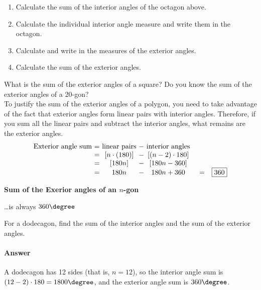 	\vspace{0.1cm}

\begin{enumerate}
\item  Calculate the sum of the interior angles of the octagon above.
\item  Calculate the individual interior angle measure and write them in the octagon.
\item  Calculate and write in the measures of the exterior angles.
\item  Calculate the sum of the exterior angles.
\end{enumerate}

\noindent \q What is the sum of the exterior angles of a square?  Do you know the sum of the exterior angles of a 20-gon?\\
	
	
To justify the sum of the exterior angles of a polygon, you need to take advantage of the fact that exterior angles form linear pairs with interior angles. Therefore, if you sum all the linear pairs and subtract the interior angles, what remains are the exterior angles.
\[ 
\begin{array}{r @{ = } c @{ - } c c l}
\text{Exterior angle sum } & \text{ linear pairs } & \text{ interior angles } \\
& [n\cdot (180)] & [(n-2) \cdot 180] \\
& [180n]& [180n-360] \\
&180n&180n+360&=&\fbox{360}\\
\end{array}
\]

\begin{tcolorbox}
\textbf{Sum of the Exerior angles of an $n$-gon}\\

\begin{center}
\dots is always $360\degree$
\end{center}

\end{tcolorbox}

\noindent \q For a dodecagon, find the sum of the interior angles and the sum of the exterior angles.

\paragraph{Answer} A dodecagon has 12 sides (that is, $n=12$),
so the interior angle sum is $(12-2)\cdot 180 = 1800\degree$,
and the exterior angle sum is $360\degree$.

